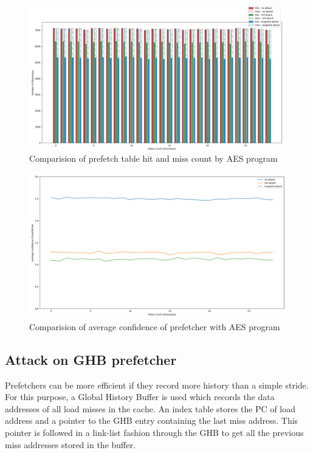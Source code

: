 \begin{figure}[h]
    \centering
    \includegraphics[width=\textwidth]{figures/pf_hits}
    \caption{Comparision of prefetch table hit and miss count by AES program}
    \label{fig:targeted_hitrate}
\end{figure}

\begin{figure}[h]
    \centering
    \includegraphics[width=\textwidth]{figures/avg_conf}
    \caption{Comparision of average confidence of prefetcher with AES program}
    \label{fig:targeted_avgconf}
\end{figure}

\subsection{Attack on GHB prefetcher}

Prefetchers can be more efficient if they record more history than
a simple stride. For this purpose, a Global History Buffer is used which
records the data addresses of all load misses in the cache.
An index table stores the PC of load address and a pointer to the GHB
entry containing the last miss address. This pointer is followed in a link-list
fashion through the GHB to get all the previous miss addresses stored
in the buffer.

